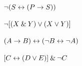 \begin{earg}

\item ${\neg} (S \leftrightarrow (P \rightarrow S))$



 \item ${\neg} [(X \mathbin{\&} Y) \vee (X \vee Y)]$



\item $(A \rightarrow B) \leftrightarrow ({\neg} B\leftrightarrow {\neg} A)$

\item $[C \leftrightarrow (D \vee E)] \mathbin{\&} {\neg} C$



\end{earg}
